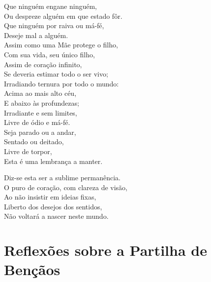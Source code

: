 \documentclass[
  babelLanguage=portuguese,
  final,
  showtrims,
]{chantingbook}
\begin{document}
Que ninguém engane ninguém,\\
Ou despreze alguém em que estado fôr.\\
Que ninguém por raiva ou má-fé,\\
Deseje mal a alguém.\\
Assim como uma Mãe protege o filho,\\
Com sua vida, seu único filho,\\
Assim de coração infinito,\\
Se deveria estimar todo o ser vivo;\\
Irradiando ternura por todo o mundo:\\
Acima ao mais alto céu,\\
E abaixo às profundezas;\\
Irradiante e sem limites,\\
Livre de ódio e má-fé.\\
Seja parado ou a andar,\\
Sentado ou deitado,\\
Livre de torpor,\\
Esta é uma lembrança a manter.

Diz-se esta ser a sublime permanência.\\
O puro de coração, com clareza de visão,\\
Ao não insistir em ideias fixas,\\
Liberto dos desejos dos sentidos,\\
Não voltará a nascer neste mundo.

\chapter{Reflexões sobre a Partilha de Bençãos}

\begin{leader}
\end{leader}
\end{document}
